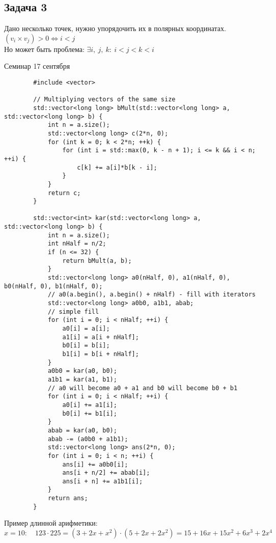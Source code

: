 \documentclass[12pt, a4paper]{article}
\begin{document}
    \subsection*{Задача 3}
    Дано несколько точек, нужно упорядочить их в полярных координатах.\\
    $(v_i\times v_j) > 0 \Leftrightarrow i < j$\\
    Но может быть проблема: $\exists i,\ j,\ k:\ i < j < k < i$
    \begin{center}
        Семинар 17 сентября
    \end{center}
    \begin{lstlisting}
        #include <vector>

        // Multiplying vectors of the same size
        std::vector<long long> bMult(std::vector<long long> a, std::vector<long long> b) {
            int n = a.size();
            std::vector<long long> c(2*n, 0);
            for (int k = 0; k < 2*n; ++k) {
                for (int i = std::max(0, k - n + 1); i <= k && i < n; ++i) {
                    c[k] += a[i]*b[k - i];
                }
            }
            return c;
        }

        std::vector<int> kar(std::vector<long long> a, std::vector<long long> b) {
            int n = a.size();
            int nHalf = n/2;
            if (n <= 32) {
                return bMult(a, b);
            }
            std::vector<long long> a0(nHalf, 0), a1(nHalf, 0), b0(nHalf, 0), b1(nHalf, 0);
            // a0(a.begin(), a.begin() + nHalf) - fill with iterators
            std::vector<long long> a0b0, a1b1, abab;
            // simple fill
            for (int i = 0; i < nHalf; ++i) {
                a0[i] = a[i];
                a1[i] = a[i + nHalf];
                b0[i] = b[i];
                b1[i] = b[i + nHalf];
            }
            a0b0 = kar(a0, b0);
            a1b1 = kar(a1, b1);
            // a0 will become a0 + a1 and b0 will become b0 + b1
            for (int i = 0; i < nHalf; ++i) {
                a0[i] += a1[i];
                b0[i] += b1[i];
            }
            abab = kar(a0, b0);
            abab -= (a0b0 + a1b1);
            std::vector<long long> ans(2*n, 0);
            for (int i = 0; i < n; ++i) {
                ans[i] += a0b0[i];
                ans[i + n/2] += abab[i];
                ans[i + n] += a1b1[i];
            }
            return ans;
        }
    \end{lstlisting}
    Пример длинной арифметики:\\
    $x = 10:\quad 123\cdot 225 = (3 + 2x + x^2)\cdot (5 + 2x + 2x^2) = 15 + 16x + 15x^2 + 6x^3 + 2x^4$\\
\end{document}
